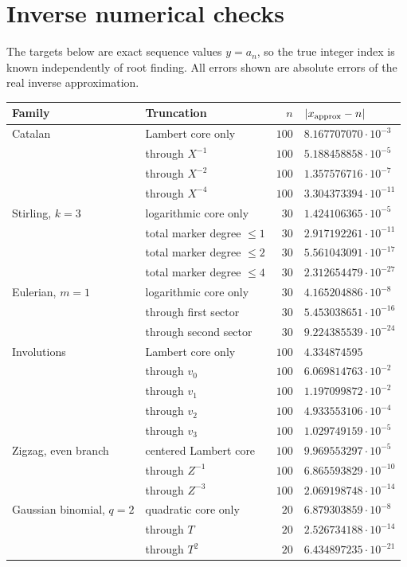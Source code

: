 \documentclass[11pt,openany]{book}
\numberwithin{equation}{chapter}
\theoremstyle{plain}
\theoremstyle{definition}
\theoremstyle{remark}
\begin{document}
\section{Inverse numerical checks}
The targets below are exact sequence values $y=a_n$, so the true integer index is known independently of root finding. All errors shown are absolute errors of the real inverse approximation.
\begin{center}
\small
\begin{tabular}{@{}llrl@{}}
\toprule
Family & Truncation & $n$ & $|x_{\rm approx}-n|$\\
\midrule
Catalan & Lambert core only & $100$ & $8.167707070\cdot10^{-3}$\\
 & through $X^{-1}$ & $100$ & $5.188458858\cdot10^{-5}$\\
 & through $X^{-2}$ & $100$ & $1.357576716\cdot10^{-7}$\\
 & through $X^{-4}$ & $100$ & $3.304373394\cdot10^{-11}$\\
\addlinespace
Stirling, $k=3$ & logarithmic core only & $30$ & $1.424106365\cdot10^{-5}$\\
 & total marker degree $\le1$ & $30$ & $2.917192261\cdot10^{-11}$\\
 & total marker degree $\le2$ & $30$ & $5.561043091\cdot10^{-17}$\\
 & total marker degree $\le4$ & $30$ & $2.312654479\cdot10^{-27}$\\
\addlinespace
Eulerian, $m=1$ & logarithmic core only & $30$ & $4.165204886\cdot10^{-8}$\\
 & through first sector & $30$ & $5.453038651\cdot10^{-16}$\\
 & through second sector & $30$ & $9.224385539\cdot10^{-24}$\\
\addlinespace
Involutions & Lambert core only & $100$ & $4.334874595$\\
 & through $v_0$ & $100$ & $6.069814763\cdot10^{-2}$\\
 & through $v_1$ & $100$ & $1.197099872\cdot10^{-2}$\\
 & through $v_2$ & $100$ & $4.933553106\cdot10^{-4}$\\
 & through $v_3$ & $100$ & $1.029749159\cdot10^{-5}$\\
\addlinespace
Zigzag, even branch & centered Lambert core & $100$ & $9.969553297\cdot10^{-5}$\\
 & through $Z^{-1}$ & $100$ & $6.865593829\cdot10^{-10}$\\
 & through $Z^{-3}$ & $100$ & $2.069198748\cdot10^{-14}$\\
\addlinespace
Gaussian binomial, $q=2$ & quadratic core only & $20$ & $6.879303859\cdot10^{-8}$\\
 & through $T$ & $20$ & $2.526734188\cdot10^{-14}$\\
 & through $T^2$ & $20$ & $6.434897235\cdot10^{-21}$\\
\bottomrule
\end{tabular}
\end{center}
\end{document}
